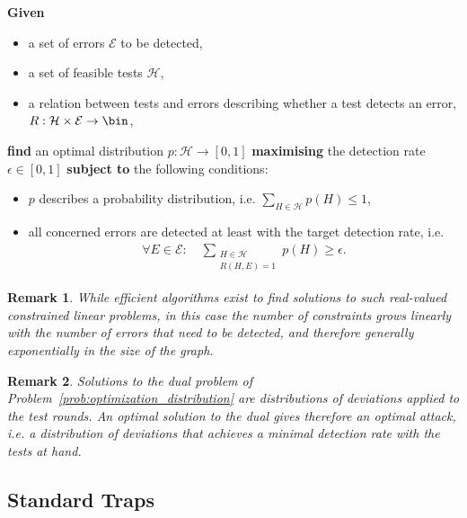\documentclass[12pt]{iopart}
\renewcommand{\1}{\mathds{1}}
\newtheorem{remark}{Remark}
\begin{document}
\begin{problem}
\caption{Optimisation of the Distribution of Tests}\label{prob:optimization_distribution}
	\textbf{Given}
	\begin{itemize}
		\item a set of errors $\mathcal{E}$ to be detected,
		\item a set of feasible tests $\mathcal{H}$,
		\item a relation between tests and errors describing whether a test detects an error, $R : \mathcal{H} \times \mathcal{E} \to \bin$,
	\end{itemize}
	\textbf{find} an optimal distribution $p: \mathcal{H} \to [0,1]$ \textbf{maximising} the detection rate $\epsilon \in [0,1]$ \textbf{subject to} the following conditions:
	\begin{itemize}
		\item $p$ describes a probability distribution, i.e. $\sum_{H\in\mathcal{H}} p(H) \leq 1$,
		\item all concerned errors are detected at least with the target detection rate, i.e.
			\begin{align}
				\forall E \in \mathcal{E} : \quad \sum_{\substack{H\in\mathcal{H}\\R(H,E)=1}} p(H) \geq \epsilon.
			\end{align}
	\end{itemize}
\end{problem}

\begin{remark}
	While efficient algorithms exist to find solutions to such real-valued constrained linear problems, in this case the number of constraints grows linearly with the number of errors that need to be detected, and therefore generally exponentially in the size of the graph.
\end{remark}

\begin{remark}
	Solutions to the dual problem of Problem~\ref{prob:optimization_distribution} are distributions of deviations applied to the test rounds. An optimal solution to the dual gives therefore an optimal attack, i.e. a distribution of deviations that achieves a minimal detection rate with the tests at hand.
\end{remark}

\subsection{Standard Traps}
\end{document}
